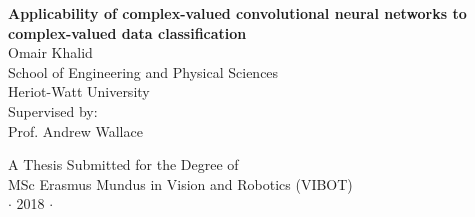 
\newpage
\thispagestyle{empty}

\vspace*{2cm}
\begin{center}
{\Large\bf Applicability of complex-valued convolutional neural networks to complex-valued data classification\\} \vspace{2cm} {\large
Omair Khalid\\
\vspace{2cm}
School of Engineering and Physical Sciences \\
Heriot-Watt University\\
\vspace{2cm}
Supervised by: \\
\centering Prof. Andrew Wallace
}

\end{center}

\vspace{5cm}
\begin{center}
{\large A Thesis Submitted for the Degree of \\MSc Erasmus Mundus
in Vision and Robotics (VIBOT) \\\vspace{0.3cm} $\cdot$ 2018
$\cdot$}
\end{center}
\singlespacing



